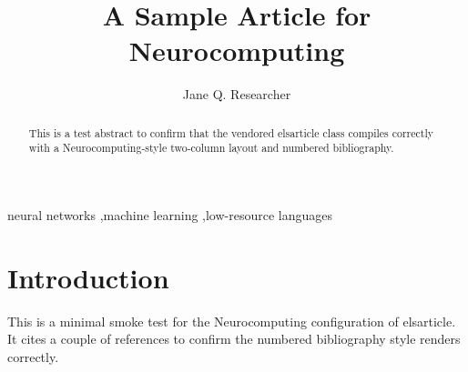 \documentclass[5p,times,twocolumn]{elsarticle}
\begin{document}
\begin{frontmatter}

\title{A Sample Article for Neurocomputing}

\author{Jane Q. Researcher}
\address{Some University, Algiers, Algeria}

\begin{abstract}
This is a test abstract to confirm that the vendored elsarticle class
compiles correctly with a Neurocomputing-style two-column layout and
numbered bibliography.
\end{abstract}

\begin{keyword}
neural networks \sep machine learning \sep low-resource languages
\end{keyword}

\end{frontmatter}

\section{Introduction}
This is a minimal smoke test for the Neurocomputing configuration of
elsarticle. It cites a couple of references \cite{lecun2015deep,vaswani2017attention}
to confirm the numbered bibliography style renders correctly.



\end{document}
